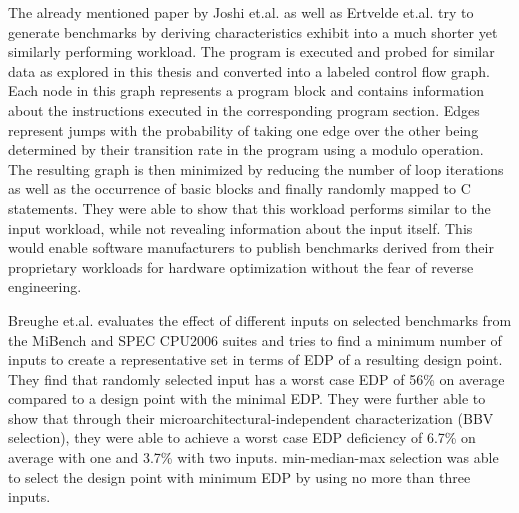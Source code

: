 \documentclass[../bachelor_paper.tex]{subfiles}
\begin{document}
The already mentioned paper by Joshi et.al. \cite{joshiDistillingEssenceProprietary2008} as well as Ertvelde et.al. \cite{vanertveldeBenchmarkSynthesisArchitecture2010} try to generate benchmarks by deriving characteristics exhibit into a much shorter yet similarly performing workload. The program is executed and probed for similar data as explored in this thesis and converted into a labeled control flow graph. Each node in this graph represents a program block and contains information about the instructions executed in the corresponding program section. Edges represent jumps with the probability of taking one edge over the other being determined by their transition rate in the program using a modulo operation. The resulting graph is then minimized by reducing the number of loop iterations as well as the occurrence of basic blocks and finally randomly mapped to C statements. They were able to show that this workload performs similar to the input workload, while not revealing information about the input itself. This would enable software manufacturers to publish benchmarks derived from their proprietary workloads for hardware optimization without the fear of reverse engineering.

Breughe et.al. \cite{breugheSelectingRepresentativeBenchmark2013} evaluates the effect of different inputs on selected benchmarks from the MiBench and SPEC CPU2006 suites and tries to find a minimum number of inputs to create a representative set in terms of \ac{EDP} of a resulting design point. They find that randomly selected input has a worst case \ac{EDP} of 56\% on average compared to a design point with the minimal \ac{EDP}. They were further able to show that through their microarchitectural-independent characterization (BBV selection), they were able to achieve a worst case \ac{EDP} deficiency of 6.7\% on average with one and 3.7\% with two inputs. min-median-max selection was able to select the design point with minimum \ac{EDP} by using no more than three inputs.
\end{document}
